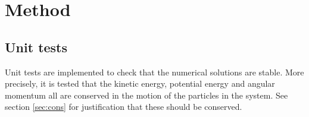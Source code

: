 \section{Method}

\subsection{Unit tests}
Unit tests are implemented to check that the numerical solutions are stable. More precisely, it is tested that the kinetic energy, potential energy and angular momentum all are conserved in the motion of the particles in the system. See section \ref{sec:cons} for justification that these should be conserved. 
